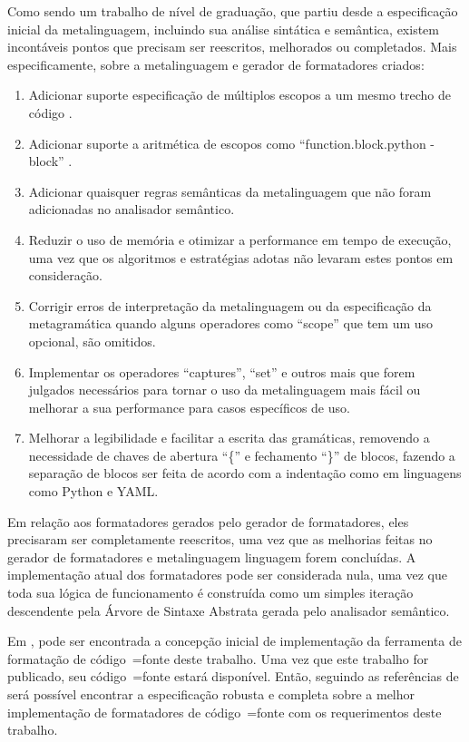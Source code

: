 Como sendo um trabalho de nível de graduação,
que partiu desde a especificação inicial da metalinguagem,
incluindo sua análise sintática e
semântica,
existem incontáveis pontos que precisam ser reescritos,
melhorados ou completados. Mais especificamente,
sobre a metalinguagem e
gerador de formatadores criados:
\begin{enumerate}
\item Adicionar suporte especificação de múltiplos escopos a um mesmo trecho de código \cite{vsCodeSyntaxHighlighthing}.
\item Adicionar suporte a aritmética de escopos como ``function.block.python - block'' \cite{textMateScopeExclusion}.
\item Adicionar quaisquer regras semânticas da metalinguagem que não foram adicionadas no analisador semântico.
\item Reduzir o uso de memória e
otimizar a performance em tempo de execução,
uma vez que os algoritmos e
estratégias adotas não levaram estes pontos em consideração.
\item Corrigir erros de interpretação da metalinguagem ou
da especificação da metagramática quando alguns operadores como ``scope'' que tem um uso opcional,
são omitidos.
\item Implementar os operadores ``captures'',
``set'' e
outros mais que forem julgados necessários para tornar o uso da metalinguagem mais fácil ou
melhorar a sua performance para casos específicos de uso.
\item Melhorar a legibilidade e
facilitar a escrita das gramáticas,
removendo a necessidade de chaves de abertura ``\{'' e
fechamento ``\}'' de blocos,
fazendo a separação de blocos ser feita de acordo com a indentação como em linguagens como Python e
YAML.
\end{enumerate}%

Em relação aos formatadores gerados pelo gerador de formatadores,
eles precisaram ser completamente reescritos,
uma vez que as melhorias feitas no gerador de formatadores e
metalinguagem linguagem forem concluídas.
A implementação atual dos formatadores pode ser considerada nula,
uma vez que toda sua lógica de funcionamento é construída como um simples iteração descendente pela Árvore de Sintaxe Abstrata gerada pelo analisador semântico.

Em ,
pode ser encontrada a concepção inicial de implementação da ferramenta de formatação de código~=fonte deste trabalho.
Uma vez que este trabalho for publicado,
seu código~=fonte estará disponível.
Então,
seguindo as referências de  será possível encontrar a especificação robusta e
completa sobre a melhor implementação de formatadores de código~=fonte com os requerimentos deste trabalho.

